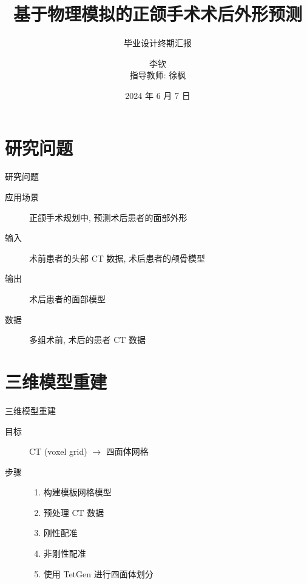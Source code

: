 \documentclass{beamer}
\title{基于物理模拟的正颌手术术后外形预测}
\subtitle{毕业设计终期汇报}
\author{李钦 \\ 指导教师: 徐枫}
\institute{清华大学软件学院}
\date{2024 年 6 月 7 日}
\begin{document}
\kaishu

\begin{frame}
  \titlepage
\end{frame}

\begin{frame}
  \tableofcontents[sectionstyle=show,subsectionstyle=show/shaded/hide,subsubsectionstyle=show/shaded/hide]
\end{frame}

\section{研究问题}

\begin{frame}{研究问题}
  \begin{description}
    \item[应用场景] 正颌手术规划中, 预测术后患者的面部外形
    \item[输入] 术前患者的头部 CT 数据, 术后患者的颅骨模型
    \item[输出] 术后患者的面部模型
    \item[数据] 多组术前, 术后的患者 CT 数据
  \end{description}
\end{frame}

\section{三维模型重建}

\begin{frame}{三维模型重建}
  \begin{description}
    \item[目标] CT (voxel grid) $\to$ 四面体网格
    \item[步骤]
          \begin{enumerate}
            \item 构建模板网格模型
            \item 预处理 CT 数据
            \item 刚性配准
            \item 非刚性配准
            \item 使用 TetGen 进行四面体划分
          \end{enumerate}
  \end{description}
  \begin{figure}
    \centering
     \quad
  \end{figure}
\end{frame}
\end{document}
